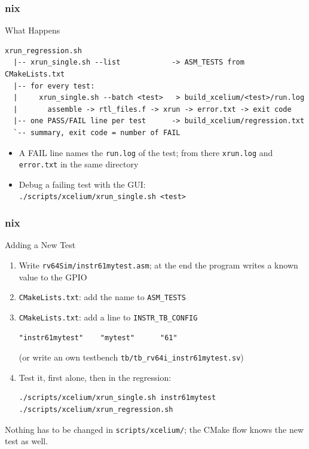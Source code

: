 \documentclass{beamer}
\newcommand{\astitle}{nix}
\newcommand{\assubtitle}{nix}
\newcommand{\cmd}[1]{\texttt{#1}}
\begin{document}
\renewcommand{\assubtitle}{What Happens}
\begin{frame}[fragile]
\frametitle{\astitle}
\begin{block}{\assubtitle}
\begin{lstlisting}
xrun_regression.sh
  |-- xrun_single.sh --list            -> ASM_TESTS from CMakeLists.txt
  |-- for every test:
  |     xrun_single.sh --batch <test>   > build_xcelium/<test>/run.log
  |       assemble -> rtl_files.f -> xrun -> error.txt -> exit code
  |-- one PASS/FAIL line per test      -> build_xcelium/regression.txt
  `-- summary, exit code = number of FAIL
\end{lstlisting}
  \begin{itemize}
    \item A FAIL line names the \cmd{run.log} of the test; from there
      \cmd{xrun.log} and \cmd{error.txt} in the same directory
    \item Debug a failing test with the GUI:\\
      \cmd{./scripts/xcelium/xrun\_single.sh <test>}
  \end{itemize}
\end{block}
\end{frame}

\renewcommand{\assubtitle}{Adding a New Test}
\begin{frame}[fragile]
\frametitle{\astitle}
\begin{block}{\assubtitle}
  \footnotesize
  \begin{enumerate}
    \item Write \cmd{rv64Sim/instr61mytest.asm}; at the end the program writes
      a known value to the GPIO
    \item \cmd{CMakeLists.txt}: add the name to \cmd{ASM\_TESTS}
    \item \cmd{CMakeLists.txt}: add a line to \cmd{INSTR\_TB\_CONFIG}
\begin{lstlisting}
"instr61mytest"    "mytest"      "61"
\end{lstlisting}
      (or write an own testbench \cmd{tb/tb\_rv64i\_instr61mytest.sv})
    \item Test it, first alone, then in the regression:
\begin{lstlisting}[style=sh]
./scripts/xcelium/xrun_single.sh instr61mytest
./scripts/xcelium/xrun_regression.sh
\end{lstlisting}
  \end{enumerate}
  Nothing has to be changed in \cmd{scripts/xcelium/}; the CMake flow
  knows the new test as well.
\end{block}
\end{frame}
\end{document}
